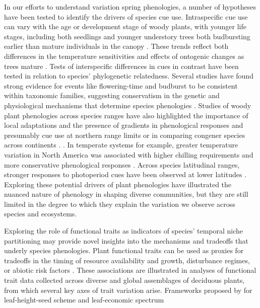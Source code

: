 \documentclass{article}\usepackage[]{graphicx}\usepackage[]{color}
\begin{document}
In our efforts to understand variation spring phenologies, a number of hypotheses have been tested to identify the drivers of species cue use. Intraspecific cue use can vary with the age or development stage of woody plants, with younger life stages, including both seedlings and younger understory trees both budbursting earlier than mature individuals in the canopy \citep{Vitasse2013, Seiwa1999}. These trends reflect both differences in the temperature sensitivities and effects of ontogenic changes as trees mature \citep{Vitasse2013, Seiwa1999}. Tests of interspecific differences in cues in contrast have been tested in relation to species' phylogenetic relatedness. Several studies have found strong evidence for events like flowering-time and budburst to be consistent within taxonomic families, suggesting conservatism in the genetic and physiological mechanisms that determine species phenologies \citep{Kochmer1986, Davies2013, Gougherty2018}. Studies of woody plant phenologies across species ranges have also highlighted the importance of local adaptations and the presence of gradients in phenological responses and presumably cue use at northern range limits or in comparing congener species across continents \citep{Lechowicz1984, Chuine2001, Chuine2010}. \citep{Zohner2017}. In temperate systems for example, greater temperature variation in North America was associated with higher chilling requirements and more conservative phenological responses \citep{Zohner2017}.  Across species latitudinal ranges, stronger responses to photoperiod cues have been observed at lower latitudes \citep{Zohner2016}. Exploring these potential drivers of plant phenologies have illustrated the nuanced nature of phenology in shaping diverse communities, but they are still limited in the degree to which they explain the variation we observe across species and ecosystems.

Exploring the role of functional traits as indicators of species' temporal niche partitioning may provide novel insights into the mechanisms and tradeoffs that underly species phenologies. Plant functional traits can be used as proxies for tradeoffs in the timing of resource availability and growth, disturbance regimes, or abiotic risk factors \citep{citation}. These associations are illustrated in analyses of functional trait data collected across diverse and global assemblages of deciduous plants, from which several key axes of trait variation arise. Frameworks proposed by \citep{Westoby1998} for leaf-height-seed scheme and leaf-economic spectrum 
\end{document}
